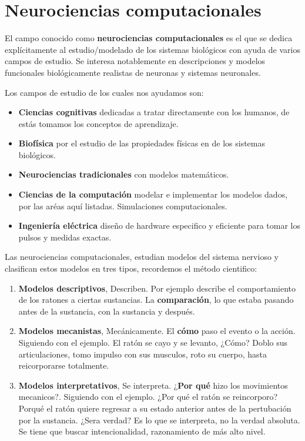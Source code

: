 \section{Neurociencias computacionales}

El campo conocido como \textbf{neurociencias computacionales}\parencite{sonNC} es el que se dedica explícitamente al estudio/modelado de los sistemas biológicos con ayuda de varios campos de estudio. Se interesa notablemente en descripciones y modelos funcionales biológicamente realistas de neuronas y sistemas neuronales. 

Los campos de estudio de los cuales nos ayudamos son:
\begin{itemize}
 \item  \textbf{Ciencias cognitivas} dedicadas a tratar directamente con los humanos, de estás tomamos los conceptos de aprendizaje.
 \item  \textbf{Biofísica}  por el estudio de las propiedades físicas en de los sistemas biológicos. 
 \item  \textbf{Neurociencias tradicionales} con modelos matemáticos. 
 
 \item  \textbf{Ciencias de la computación} modelar e implementar los modelos dados, por las aréas aquí listadas. Simulaciones computacionales. 
 
 \item  \textbf{Ingeniería eléctrica} diseño de hardware especifico y eficiente para tomar los pulsos y medidas exactas.  
 
\end{itemize}

Las neurociencias computacionales, estudian modelos del sistema nervioso y clasifican estos modelos en tres tipos, recordemos el método cientifico: 

\begin{enumerate}
 \item \textbf{Modelos descriptivos}, Describen. Por ejemplo describe el comportamiento de los ratones a ciertas sustancias. La \textbf{comparación}, lo que estaba pasando antes de la sustancia, con la sustancia y después. 
  
 \item \textbf{Modelos mecanistas}, Mecánicamente. El \textbf{cómo} paso el evento o la acción. Siguiendo con el ejemplo. El ratón se cayo y se levanto, ¿Cómo? Doblo sus articulaciones, tomo impulso con sus musculos, roto su cuerpo, hasta reicorporarse totalmente.
 
 \item \textbf{Modelos interpretativos}, Se interpreta. ¿\textbf{Por qué} hizo los movimientos mecanicos?. Siguiendo con el ejemplo. ¿Por qué el ratón se reincorporo? Porqué el ratón quiere regresar a su estado anterior antes de la pertubación por la sustancia. ¿Sera verdad? Es lo que se interpreta, no la verdad absoluta. Se tiene que buscar intencionalidad, razonamiento de más alto nivel.
 
\end{enumerate}

